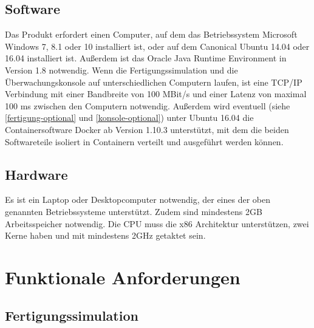 \documentclass[parskip=full]{scrartcl}
\begin{document}
\subsection{Software}
Das Produkt erfordert einen Computer, auf dem das Betriebssystem Microsoft Windows 7, 8.1 oder 10 installiert ist,
oder auf dem Canonical Ubuntu 14.04 oder 16.04 installiert ist. Außerdem ist das Oracle Java Runtime Environment in Version 1.8
notwendig. Wenn die Fertigungssimulation und die Überwachungskonsole auf unterschiedlichen Computern laufen,
ist eine TCP/IP Verbindung mit einer Bandbreite von 100 MBit/s und einer Latenz von maximal 100 ms zwischen den Computern notwendig.
Außerdem wird eventuell (siehe \ref{fertigung-optional} und \ref{konsole-optional}) unter Ubuntu 16.04 die Containersoftware Docker
ab Version 1.10.3 unterstützt, mit dem die beiden Softwareteile isoliert in Containern verteilt und ausgeführt werden können.

\subsection{Hardware}
\label{Hardware}
Es ist ein Laptop oder Desktopcomputer notwendig, der eines der oben genannten Betriebssysteme unterstützt.
Zudem sind mindestens 2GB Arbeitsspeicher notwendig. Die CPU muss die x86 Architektur unterstützen, zwei Kerne haben und mit
mindestens 2GHz getaktet sein.

\pagebreak
\section{Funktionale Anforderungen}
\subsection{Fertigungssimulation}
\end{document}
